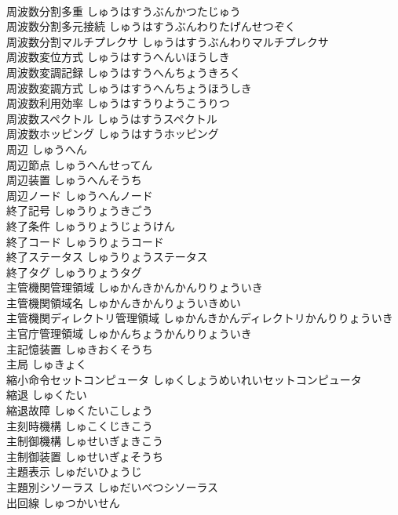\documentclass[8pt]{extreport}
\begin{document}
\begin{CJK}{UTF8}{min}
\\	周波数分割多重	しゅうはすうぶんかつたじゅう	
\\	周波数分割多元接続	しゅうはすうぶんわりたげんせつぞく	
\\	周波数分割マルチプレクサ	しゅうはすうぶんわりマルチプレクサ	
\\	周波数変位方式	しゅうはすうへんいほうしき	
\\	周波数変調記録	しゅうはすうへんちょうきろく	
\\	周波数変調方式	しゅうはすうへんちょうほうしき	
\\	周波数利用効率	しゅうはすうりようこうりつ	
\\	周波数スペクトル	しゅうはすうスペクトル	
\\	周波数ホッピング	しゅうはすうホッピング	
\\	周辺	しゅうへん	
\\	周辺節点	しゅうへんせってん	
\\	周辺装置	しゅうへんそうち	
\\	周辺ノード	しゅうへんノード	
\\	終了記号	しゅうりょうきごう	
\\	終了条件	しゅうりょうじょうけん	
\\	終了コード	しゅうりょうコード	
\\	終了ステータス	しゅうりょうステータス	
\\	終了タグ	しゅうりょうタグ	
\\	主管機関管理領域	しゅかんきかんかんりりょういき	
\\	主管機関領域名	しゅかんきかんりょういきめい	
\\	主管機関ディレクトリ管理領域	しゅかんきかんディレクトリかんりりょういき	
\\	主官庁管理領域	しゅかんちょうかんりりょういき	
\\	主記憶装置	しゅきおくそうち	
\\	主局	しゅきょく	
\\	縮小命令セットコンピュータ	しゅくしょうめいれいセットコンピュータ	
\\	縮退	しゅくたい	
\\	縮退故障	しゅくたいこしょう	
\\	主刻時機構	しゅこくじきこう	
\\	主制御機構	しゅせいぎょきこう	
\\	主制御装置	しゅせいぎょそうち	
\\	主題表示	しゅだいひょうじ	
\\	主題別シソーラス	しゅだいべつシソーラス	
\\	出回線	しゅつかいせん	

\end{CJK}
\end{document}
